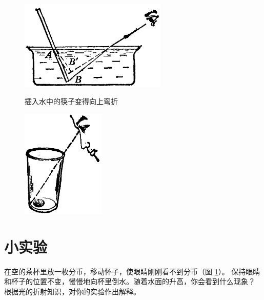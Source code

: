 \begin{figure}[htbp]
    \centering
    \begin{minipage}{7cm}
    \centering
    \includegraphics[width=7cm]{../pic/czwl2-ch1-19}
    \caption{插入水中的筷子变得向上弯折}\label{fig:1-19}
    \end{minipage}
    \qquad
    \begin{minipage}{7cm}
    \centering
    \includegraphics[width=4cm]{../pic/czwl2-ch1-20}
    \caption{}\label{fig:1-20}
    \end{minipage}
\end{figure}


\section*{小实验}

在空的茶杯里放一枚分币，移动怀子，使眼睛刚刚看不到分币（图 \ref{fig:1-20}）。
保持眼睛和杯子的位置不变，慢慢地向杯里倒水。随着水面的升高，你会看到什么现象？
根据光的折射知识，对你的实验作出解释。


